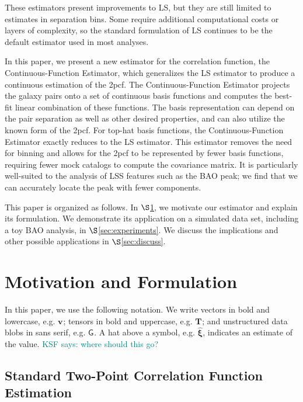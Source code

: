 \documentclass[modern]{aastex62}
\newcommand{\cf}{2pcf\xspace} %
\newcommand{\Est}{The Continuous-Function Estimator\xspace}
\newcommand{\est}{the Continuous-Function Estimator\xspace}
\newcommand{\LS}{LS\xspace}
\newcommand{\bld}[1]{\bm{#1}} %
\newcommand{\vv}[1]{\bld{v}_\mathrm{#1}}
\newcommand{\TT}[1]{\bld{T}_\mathrm{#1}}
\newcommand{\GG}[1]{\mathsf{G}_{#1}}
\newcommand{\KSF}[1]{\textcolor{teal}{KSF says: #1}}
\begin{document}
These estimators present improvements to \LS, but they are still limited to estimates in separation bins.
Some require additional computational costs or layers of complexity, so the standard formulation of \LS continues to be the default estimator used in most analyses.

In this paper, we present a new estimator for the correlation function, \est, which generalizes the \LS estimator to produce a continuous estimation of the \cf. 
\Est projects the galaxy pairs onto a set of continuous basis functions and computes the best-fit linear combination of these functions.
The basis representation can depend on the pair separation as well as other desired properties, and can also utilize the known form of the \cf.
For top-hat basis functions, \est exactly reduces to the \LS estimator. 
This estimator removes the need for binning and allows for the \cf to be represented by fewer basis functions, requiring fewer mock catalogs to compute the covariance matrix.
It is particularly well-suited to the analysis of LSS features such as the BAO peak; we find that we can accurately locate the peak with fewer components.

This paper is organized as follows. 
In $\S$\ref{sec:motiv}, we motivate our estimator and explain its formulation.
We demonstrate its application on a simulated data set, including a toy BAO analysis, in $\S$\ref{sec:experiments}.
We discuss the implications and other possible applications in $\S$\ref{sec:discuss}. 

\section{Motivation and Formulation} 
\label{sec:motiv}

In this paper, we use the following notation.
We write vectors in bold and lowercase, e.g. $\vv{}$; tensors in bold and uppercase, e.g. $\TT{}$; and unstructured data blobs in sans serif, e.g. $\GG{}$.
A hat above a symbol, e.g. $\bld{\hat{\xi}}$, indicates an estimate of the value.
\KSF{where should this go?}

\subsection{Standard Two-Point Correlation Function Estimation}
\end{document}
